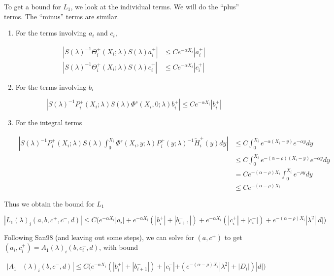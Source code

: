 \documentclass[12pt]{article}
\begin{document}
To get a bound for $L_1$, we look at the individual terms. We will do the ``plus'' terms. The ``minus'' terms are similar.

\begin{enumerate}

\item For the terms involving $a_i$ and $c_i$,

\begin{align*}
|S(\lambda)^{-1} \Theta_i^+(X_i; \lambda) S(\lambda) a_i^+|
&\leq C e^{-\alpha X_i} |a_i^+| \\
| S(\lambda)^{-1} \Theta_i^+(X_i; \lambda) S(\lambda) c_i^+|
&\leq C e^{-\alpha X_i} |c_i^+| 
\end{align*}

\item For the terms involving $b_i$

\[
|S(\lambda)^{-1} P_i^+(X_i; \lambda) S(\lambda) \Phi^s(X_i, 0; \lambda) b_i^+| \leq C e^{-\alpha X_i} |b_i^+|
\]

\item For the integral terms

\begin{align*}
\left|
S(\lambda)^{-1} P_i^+(X_i; \lambda) S(\lambda) \int_0^{X_i} \Phi^s(X_i, y; \lambda) P_i^+(y; \lambda)^{-1} \tilde{H}_i^+(y) dy \right| 
&\leq C \int_0^{X_i} e^{-\alpha(X_i - y)}e^{-\alpha y} dy \\
&\leq C \int_0^{X_i} e^{-(\alpha - \rho)(X_i - y)}e^{-\alpha y} dy \\
&= C e^{-(\alpha - \rho) X_i} \int_0^{X_i} e^{-\rho y} dy \\ 
&\leq C e^{-(\alpha - \rho) X_i} 
\end{align*}

\end{enumerate}

Thus we obtain the bound for $L_1$

\[
|L_1(\lambda)_i(a, b, c^+, c^-, d)| \leq C \Big( e^{-\alpha X_i} |a_i| + e^{-\alpha X_i} (|b_i^+| + |b_{i+1}^-|) + e^{-\alpha X_i} (|c_i^+| + |c_i^-|) + e^{-(\alpha - \rho) X_i} |\lambda^2| |d| \Big)
\]

Following San98 (and leaving out some steps), we can solve for $(a, c^+)$ to get $(a_i, c_i^+) = A_1(\lambda)_i(b, c_i^-, d)$, with bound

\begin{align*}
|A_1&(\lambda)_i(b, c^-, d)|
\leq C \Big( e^{-\alpha X_i} (|b_i^+| + |b_{i+1}^-|) + |c_i^-| + (e^{-(\alpha - \rho) X_i} |\lambda^2| + |D_i|)|d| \Big)
\end{align*} 
\end{document}
